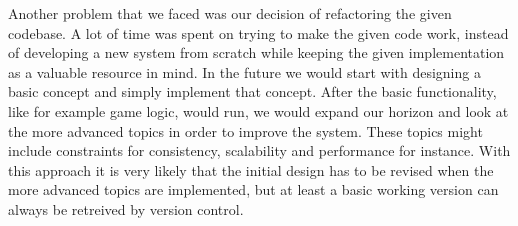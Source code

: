 Another problem that we faced was our decision of refactoring the given codebase. 
A lot of time was spent on trying to make the given code work, instead of developing a new system from scratch while keeping the given implementation as a valuable resource in mind.
In the future we would start with designing a basic concept and simply implement that concept. After the basic functionality, like for example game logic, would run, we would expand our horizon and look at the more advanced topics in order to improve the system. These topics might include constraints for consistency, scalability and performance for instance.
With this approach it is very likely that the initial design has to be revised when the more advanced topics are implemented, but at least a basic working version can always be retreived by version control.
